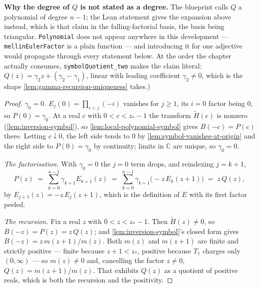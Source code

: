 \begin{lemma}
{\textbf{Why the degree of $Q$ is not stated as a degree.} The blueprint calls $Q$ a polynomial of
degree $n-1$; the Lean statement gives the expansion above instead, which is that claim in the
falling-factorial basis, the basis being triangular. \texttt{Polynomial} does not appear anywhere
in this development --- \texttt{mellinEulerFactor} is a plain function --- and introducing it for
one adjective would propagate through every statement below. At the order the chapter actually
consumes, \texttt{symbolQuotient\_two} makes the claim literal: $Q(z) = \gamma_2 z +
(\gamma_2 - \gamma_1)$, linear with leading coefficient $\gamma_2 \ne 0$, which is the shape
\ref{lem:gamma-recursion-uniqueness} takes.)}
\end{lemma}

\begin{proof}
\leanok
{}
\emph{$\gamma_0 = 0$.} $E_j(0) = \prod_{i<j}(-i)$ vanishes for $j \ge 1$, its $i = 0$ factor being
$0$, so $P(0) = \gamma_0$. At a real $c$ with $0 < c < z_* - 1$ the transform $\tilde H(c)$ is
nonzero (\ref{lem:inversion-symbol}), so \ref{lem:local-polynomial-symbol} gives $B(-c) = P(c)$
there. Letting $c \downarrow 0$, the left side tends to $0$ by
\ref{lem:symbol-vanishes-at-origin} and the right side to $P(0) = \gamma_0$ by continuity; limits
in $\mathbb{C}$ are unique, so $\gamma_0 = 0$.

\emph{The factorisation.} With $\gamma_0 = 0$ the $j = 0$ term drops, and reindexing $j = k+1$,
\[
  P(z) \;=\; \sum_{k=0}^{n-1}\gamma_{k+1}E_{k+1}(z)
        \;=\; \sum_{k=0}^{n-1}\gamma_{k+1}\bigl(-z\,E_k(z+1)\bigr)
        \;=\; z\,Q(z),
\]
by $E_{j+1}(z) = -z\,E_j(z+1)$, which is the definition of $E$ with its first factor peeled.

\emph{The recursion.} Fix a real $z$ with $0 < z < z_* - 1$. Then $\tilde H(z) \ne 0$, so
$B(-z) = P(z) = z\,Q(z)$; and \ref{lem:inversion-symbol}'s closed form gives
$B(-z) = z\,m(z+1)/m(z)$. Both $m(z)$ and $m(z+1)$ are finite and strictly positive --- finite
because $z + 1 < z_*$, positive because $T_1$ charges only $(0,\infty)$ --- so $m(z) \ne 0$ and,
cancelling the factor $z \ne 0$, $Q(z) = m(z+1)/m(z)$. That exhibits $Q(z)$ as a quotient of
positive reals, which is both the recursion and the positivity.
\end{proof}


